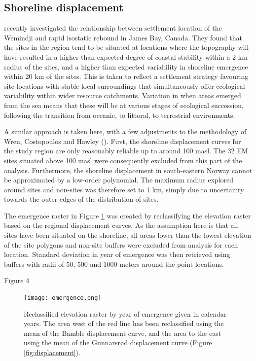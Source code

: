\documentclass[12pt, a4paper]{article}
\begin{document}
\subsection{Shoreline displacement}
\cite{wren2018} recently investigated the relationship between settlement location of the Wemindji and rapid isostatic rebound in James Bay, Canada. They found that the sites in the region tend to be situated at locations where the topography will have resulted in a higher than expected degree of coastal stability within a 2 km radius of the sites, and a higher than expected variability in shoreline emergence within 20 km of the sites. This is taken to reflect a settlement strategy favouring site locations with stable local surroundings that simultaneously offer ecological variability within wider resource catchments. Variation in when areas emerged from the sea means that these will be at various stages of ecological succession, following the transition from oceanic, to littoral, to terrestrial environments. \par 
A similar approach is taken here, with a few adjustments to the methodology of Wren, Costopoulos and Hawley (\citeyear[][]{wren2018}). First, the shoreline displacement curves for the study region are only reasonably reliable up to around 100 masl. The 32 EM sites situated above 100 masl were consequently excluded from this part of the analysis. Furthermore, the shoreline displacement in south-eastern Norway cannot be approximated by a low-order polynomial. The maximum radius explored around sites and non-sites was therefore set to 1 km, simply due to uncertainty towards the outer edges of the distribution of sites. \par The emergence raster in Figure \ref{fig:emerge} was created by reclassifying the elevation raster based on the regional displacement curves. As the assumption here is that all sites have been situated on the shoreline, all areas lower than the lowest elevation of the site polygons and non-site buffers were excluded from analysis for each location. Standard deviation in year of emergence was then retrieved using buffers with radii of 50, 500 and 1000 meters around the point locations. \par

Figure 4

\begin{figure}
	\centering
	\texttt{[image: emergence.png]}
	\caption{Reclassified elevation raster by year of emergence given in calendar years. The area west of the red line has been reclassified using the mean of the Bamble displacement curve, and the area to the east using the mean of the Gunnarsr{\o}d displacement curve (Figure \ref{fig:displacement}).}
	\label{fig:emerge}
\end{figure} 
\end{document}
